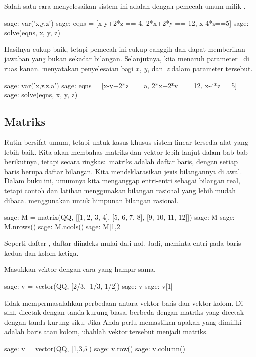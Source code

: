 Salah satu cara menyelesaikan sistem ini adalah dengan pemecah umum milik \Sage{}.
\begin{sagecommandline}
sage: var('x,y,z')                                  
sage: eqns = [x-y+2*z == 4, 2*x+2*y == 12, x-4*z==5]
sage: solve(eqns, x, y, z)                            
\end{sagecommandline}
Hasilnya cukup baik, tetapi pemecah ini cukup canggih dan dapat memberikan
jawaban yang bukan sekadar bilangan.
Selanjutnya, kita menaruh parameter~ di ruas kanan. 
\Sage{}
menyatakan penyelesaian bagi $x$, $y$, dan~$z$ dalam parameter tersebut.
\begin{sagecommandline}
sage: var('x,y,z,a')                                
sage: eqns = [x-y+2*z == a, 2*x+2*y == 12, x-4*z==5]
sage: solve(eqns, x, y, z) 
\end{sagecommandline}



\subsection{Matriks}
Rutin  bersifat umum, tetapi
untuk kasus khusus sistem linear tersedia alat yang lebih baik.
Kita akan membahas matriks dan vektor lebih lanjut dalam bab-bab berikutnya,
tetapi secara ringkas:~matriks \Sage{} adalah daftar baris, dengan
setiap baris berupa daftar bilangan. 
Kita mendeklarasikan jenis bilangannya di awal.
Dalam buku ini, umumnya kita menganggap entri-entri sebagai bilangan real,
tetapi contoh dan latihan menggunakan bilangan rasional yang
lebih mudah dibaca.
\Sage{} menggunakan  untuk himpunan bilangan rasional.
\begin{sagecommandline}
sage: M = matrix(QQ, [[1, 2, 3, 4], [5, 6, 7, 8], [9, 10, 11, 12]])
sage: M
sage: M.nrows()
sage: M.ncols()
sage: M[1,2]
\end{sagecommandline}
Seperti daftar \python{}, daftar \Sage{} diindeks mulai dari nol.  
Jadi,  meminta
entri pada baris kedua dan kolom ketiga. 

Masukkan vektor dengan cara yang hampir sama.
\begin{sagecommandline}
sage: v = vector(QQ, [2/3, -1/3, 1/2])
sage: v
sage: v[1]
\end{sagecommandline}
\Sage{} tidak mempermasalahkan perbedaan antara vektor baris dan
vektor kolom.
Di sini,  dicetak dengan tanda kurung biasa, berbeda dengan
matriks yang dicetak dengan tanda kurung siku.
Jika Anda perlu memastikan apakah yang dimiliki adalah baris atau kolom,
ubahlah vektor tersebut menjadi matriks.
\begin{sagecommandline}
sage: v = vector(QQ, [1,3,5])
sage: v.row()
sage: v.column()
\end{sagecommandline}

